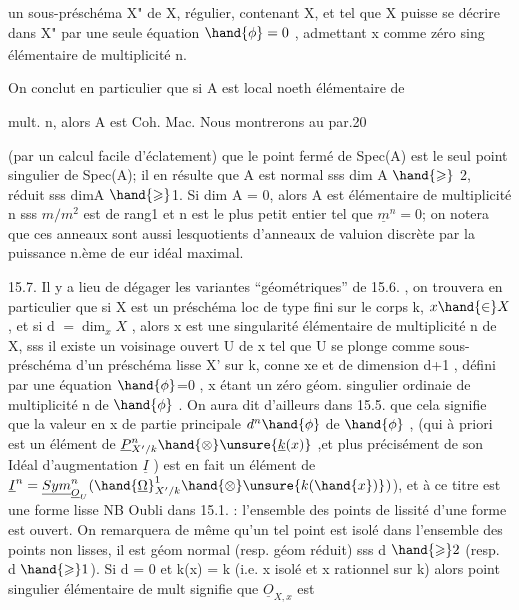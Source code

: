
un sous-préschéma X" de X, régulier,  contenant X, et tel que X
puisse se décrire dans X"\textsubscript{} par une seule équation $\hand{\phi} = 0$ , admettant x comme
zéro sing élémentaire de multiplicité n.

On conclut en particulier que si A est local noeth élémentaire de

mult. n, alors A est Coh. Mac.  Nous montrerons au par.20

(par un calcul facile d'éclatement) que le point fermé de Spec(A) est
le seul point singulier de Spec(A); il en résulte que  A est normal
sss dim A $\hand{\geqslant}$ 2, réduit sss dimA $\hand{\geqslant}$1. Si dim A = 0, alors  A est élémentaire
de multiplicité n sss  $m/m^2$ est de rang1 et  n est le plus petit entier
tel que $\underline{m}^n = 0$; on notera que ces anneaux sont aussi lesquotients d'anneaux
de valuion discrète par la puissance n.ème de eur idéal maximal.

15.7.   Il y a lieu de dégager les variantes ``géométriques'' de 15.6. ,
on trouvera en particulier que si X est un préschéma loc de type fini sur
le corps k, $x \hand{\in} X$, et si d $= \dim_x X$ , alors  x est une singularité 
élémentaire
 de multiplicité  n de X, sss il existe un voisinage ouvert U de x
tel que U se plonge comme sous-préschéma d'un préschéma lisse X' sur k,
 conne xe et de dimension d+1 , défini par une équation $\hand{\phi}$=0 , x étant
un zéro géom. singulier ordinaie de multiplicité n de $\hand{\phi}$ . On aura dit d'ailleurs
\placedmargin{$\surd$} dans 15.5. que cela signifie  que  la valeur en x de partie principale $d^n\hand{\phi}$ de $\hand{\phi}$ , 
 (qui à priori est un élément de $\underline{P}^n_{X'/k}\hand{\otimes} \unsure{\underline{k}(x)}$ ,et plus
précisément de son Idéal d'augmentation $\underline{I}$ )  est en fait un élément de
 $\underline{I}^n = \underline{Sym}^n_{\underline{O}_U}(\hand{\underline{\Omega}}^1_{X'/k}\hand{\otimes} \unsure{k(\hand{x})}\textsubscript{})$), et  à ce titre est une  forme lisse 
\placedmargin{|} \hand{[}NB Oubli dans 15.1. : l'ensemble des points de lissité d'une forme est
\placedmargin{|} ouvert\hand{]}. On remarquera de même qu'un tel point est isolé dans l'ensemble
des points non lisses, il est géom normal  (resp. géom réduit) sss
d $\hand{\geqslant} 2$  (resp. d $\hand{\geqslant} 1$). Si d = 0 et k(x) = k (i.e. x  isolé et x rationnel sur k) alors 
point singulier élémentaire  de mult\hand{\unsure{,}}  signifie que $\underline{O}_{X,x}$  est  

